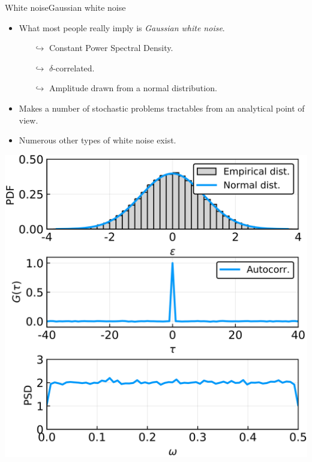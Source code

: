 \documentclass[usenames,dvipsnames,svgnames,10pt,aspectratio=169]{beamer}
\begin{document}
\begin{frame}[t, c]{White noise}{Gaussian white noise}
	\begin{minipage}{.48\textwidth}
		\begin{itemize}
			\item What most people really imply is \emph{Gaussian white noise}.
			\begin{itemize}
				\item[$\hookrightarrow$] Constant Power Spectral Density.
				\item[$\hookrightarrow$] $\delta$-correlated.
				\item[$\hookrightarrow$] Amplitude drawn from a normal distribution.
			\end{itemize}

			\item Makes a number of stochastic problems tractables from an analytical point of view.

			\medskip

			\item Numerous other types of white noise exist.
		\end{itemize}
	\end{minipage}%
	\hfill
	\begin{minipage}{.48\textwidth}
		\centering
		\includegraphics[width=.9\columnwidth]{gaussian_white_noise_total}
	\end{minipage}

	\vspace{1cm}
\end{frame}
\end{document}
